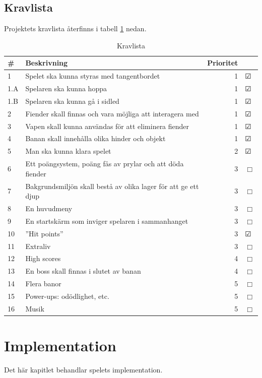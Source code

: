 \documentclass{scrartcl}
\begin{document}
\subsection{Kravlista}
Projektets kravlista återfinns i tabell \ref{kravlista} nedan.

\begin{table}[ht]
	\caption{Kravlista}\label{kravlista}
	\centering
	\begin{tabular}{lp{8cm}rl}
	\toprule
		\# & Beskrivning & Prioritet &  \\
	\midrule
	1 & Spelet ska kunna styras med tangentbordet &
		1 & $\CheckedBox$ \\
	1.A & Spelaren ska kunna hoppa &
		1 & $\CheckedBox$ \\
	1.B & Spelaren ska kunna gå i sidled &
		1 & $\CheckedBox$ \\
	2 & Fiender skall finnas och vara möjliga att interagera med &
		1 & $\CheckedBox$ \\
	3 & Vapen skall kunna användas för att eliminera fiender &
		1 & $\CheckedBox$ \\
	4 & Banan skall innehålla olika hinder och objekt  &
		1 & $\CheckedBox$ \\
	5 & Man ska kunna klara spelet &
		2 & $\CheckedBox$ \\
	6 & Ett poängsystem, poäng fås av prylar och att döda fiender &
		3 & $\Box$ \\
	7 & Bakgrundsmiljön skall bestå av olika lager för att ge ett djup &
		3 & $\Box$ \\
	8 & En huvudmeny &
		3 & $\Box$ \\
	9 & En startskärm som inviger spelaren i sammanhanget &
		3 & $\Box$ \\
	10 & ”Hit points” &
		3 & $\CheckedBox$ \\
	11 & Extraliv &
		3 & $\Box$ \\
	12 & High scores &
		4 & $\Box$ \\
	13 & En boss skall finnas i slutet av banan &
		4 & $\Box$ \\
	14 & Flera banor &
		5 & $\Box$ \\
	15 & Power-ups: odödlighet, etc. &
		5 & $\Box$ \\
	16 & Musik &
		5 & $\Box$ \\

	\bottomrule
	\end{tabular}
\end{table}

\section{Implementation}
Det här kapitlet behandlar spelets implementation.
\end{document}
